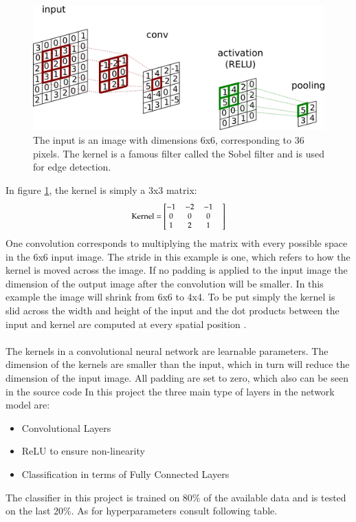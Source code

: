 \documentclass[12pt, fleqn, titlepage]{article}
\newcommand{\1}[1]{\mathds{1}\left[#1\right]}
\begin{document}
	\begin{figure}[H]
		\centering
		\includegraphics[width=0.55\linewidth, trim={0 0 69cm 0},clip]{imgs/convolution}
		\caption{The input is an image with dimensions 6x6, corresponding to 36 pixels. The kernel is a famous filter called the Sobel filter and is used for edge detection.}
		\label{fig:convolution}
	\end{figure}
	\noindent
	In figure \ref{fig:convolution}, the kernel is simply a 3x3 matrix: 
	\[\medmath{\text{Kernel} = \begin{bmatrix}
			-1 & -2 & -1 & \\ 0 & 0 & 0 &  \\
			1 & 2 & 1
	\end{bmatrix}}  \] 
	One convolution corresponds to multiplying the matrix with every possible space in the 6x6 input image. The stride in this example is one, which refers to how the kernel is moved across the image. If no padding is applied to the input image the dimension of the output image after the convolution will be smaller. In this example the image will shrink from 6x6 to 4x4. To be put simply the kernel is slid across the width and height of the input and the dot products between the input and kernel are computed at every spatial position \cite{cnn_paper}.
	\\\\
	The kernels in a convolutional neural network are learnable parameters. The dimension of the kernels are smaller than the input, which in turn will reduce the dimension of the input image. All padding are set to zero, which also can be seen in the source code %
	In this project the three main type of layers in the network model are:

	\begin{itemize}
	\item Convolutional Layers 
	\item ReLU to ensure non-linearity 
	\item Classification in terms of Fully Connected Layers
	\end{itemize}
	\noindent
	The classifier in this project is trained on 80\% of the available data and is tested on the last 20\%. As for hyperparameters consult following table.
	
\end{document}
